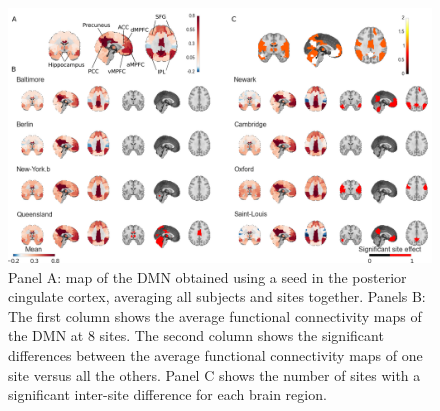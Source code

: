 \documentclass[authoryear]{elsarticle}
\begin{document}
\begin{figure}[htbp]
\begin{center}
\includegraphics[width=\linewidth]{../figures/dmn_multisite.png}
\end{center}
\caption[DMN variability across sites]{
Panel A: map of the DMN obtained using a seed in the posterior cingulate cortex, averaging all subjects and sites together. Panels B:  The first column shows the average functional connectivity maps of the DMN at 8 sites. The second column shows the significant differences between the average functional connectivity maps of one site versus all the others. Panel C shows the number of sites with a significant inter-site difference for each brain region.
}
\label{fig_DMN_variability}
\end{figure}
\end{document}
